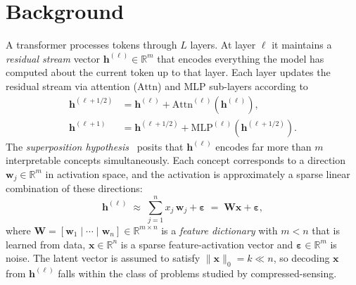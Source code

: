 \documentclass{article}
\theoremstyle{plain}
\theoremstyle{definition}
\theoremstyle{remark}
\begin{document}
\section{Background}
\label{sec:background}

A transformer processes tokens through $L$ layers.
%
At layer $\ell$ it maintains a \emph{residual stream} vector $\mathbf{h}^{(\ell)} \in \mathbb{R}^m$ that encodes everything the model has computed about the current token up to that layer.
%
Each layer updates the residual stream via attention ($\mathrm{Attn}$) and MLP sub-layers according to
%
\begin{align}
\mathbf{h}^{(\ell+1/2)} &= \mathbf{h}^{(\ell)} + \mathrm{Attn}^{(\ell)}(\mathbf{h}^{(\ell)}), \\
\mathbf{h}^{(\ell+1)}   &= \mathbf{h}^{(\ell+1/2)} + \mathrm{MLP}^{(\ell)}(\mathbf{h}^{(\ell+1/2)}).
\end{align}
%
The \emph{superposition hypothesis}~\citep{elhage2022superposition} posits that $\mathbf{h}^{(\ell)}$ encodes far more than $m$ interpretable concepts simultaneously.
%
Each concept corresponds to a direction $\mathbf{w}_j \in \mathbb{R}^m$ in activation space, and the activation is approximately a sparse linear combination of these directions:
%
\begin{equation}
    \label{eq:superposition}
    \mathbf{h}^{(\ell)} \;\approx\; \sum_{j=1}^{n} x_j\,\mathbf{w}_j + \boldsymbol{\varepsilon}
    \;=\; \mathbf{W}\mathbf{x} + \boldsymbol{\varepsilon},
\end{equation}
%
where $\mathbf{W} = [\mathbf{w}_1 \mid \cdots \mid \mathbf{w}_n] \in \mathbb{R}^{m \times n}$ is a \emph{feature dictionary} with $m < n$ that is learned from data, $\mathbf{x} \in \mathbb{R}^n$ is a sparse feature-activation vector and $\boldsymbol{\varepsilon} \in \mathbb{R}^m$ is noise.
%
The latent vector is assumed to satisfy $\|\mathbf{x}\|_0 = k \ll n$, so decoding $\mathbf{x}$ from $\mathbf{h}^{(\ell)}$ falls within the class of problems studied by compressed-sensing. 
\end{document}
